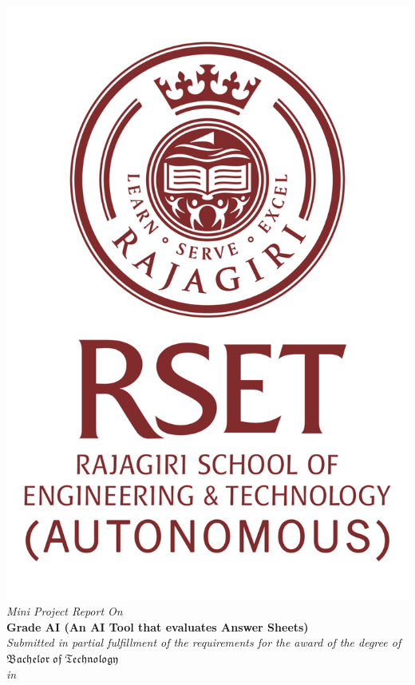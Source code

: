 \documentclass[12pt,a4paper,titlepage]{report}
\begin{document}
	\titlepage
	\thispagestyle{empty}
	\begin{center}
		\includegraphics[scale=0.3]{logo1.png}\\[0.5cm]
		\large \textit{Mini Project Report On}\\[0.6cm]
		\Large \textbf{Grade AI (An AI Tool that evaluates Answer Sheets) }\\[0.6cm]
		\textit{Submitted in partial fulfillment of the
			requirements for the award of the degree of}\\[0.6cm]
		{\huge {$\mathfrak {Bachelor\; of\; Technology}$}}\\[.2cm]
		\textit{in}\\[.2cm]

\end{center}
\end{document}

